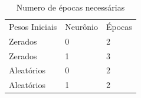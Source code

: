 \documentclass[11pt]{article}
\begin{document}
\begin{table}[h]
  \centering
  \caption{Numero de épocas necessárias}
  \label{tab:epoca_2}
  \begin{tabular}{lll}
  \rowcolor[HTML]{000000}
  {\color[HTML]{FFFFFF} Pesos Iniciais} & {\color[HTML]{FFFFFF} Neurônio} & {\color[HTML]{FFFFFF} Épocas} \\
  Zerados                               & 0                               & 2                             \\
  Zerados                               & 1                               & 3                             \\
  Aleatórios                            & 0                               & 2                             \\
  Aleatórios                            & 1                               & 2
  \end{tabular}
\end{table}
\end{document}
